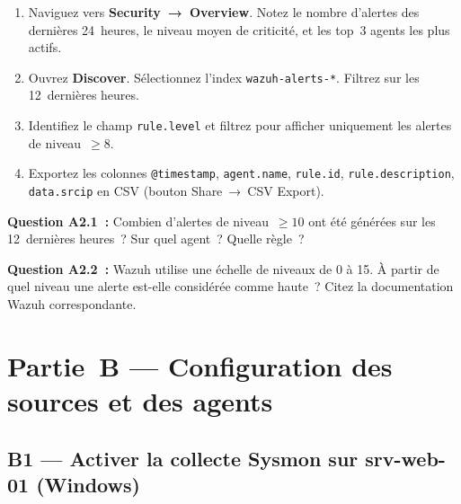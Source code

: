 \begin{enumerate}
  \item Naviguez vers \textbf{Security~→~Overview}.
        Notez le nombre d'alertes des dernières 24~heures, le niveau
        moyen de criticité, et les top~3 agents les plus actifs.
  \item Ouvrez \textbf{Discover}. Sélectionnez l'index
        \texttt{wazuh-alerts-*}. Filtrez sur les 12~dernières heures.
  \item Identifiez le champ \texttt{rule.level} et filtrez pour afficher
        uniquement les alertes de niveau~$\geq 8$.
  \item Exportez les colonnes \texttt{@timestamp},
        \texttt{agent.name}, \texttt{rule.id}, \texttt{rule.description},
        \texttt{data.srcip} en CSV (bouton Share~→~CSV Export).
\end{enumerate}

\begin{boxexo}
\textbf{Question A2.1~:} Combien d'alertes de niveau~$\geq 10$ ont été
générées sur les 12~dernières heures~? Sur quel agent~? Quelle règle~?

\medskip\textbf{Question A2.2~:} Wazuh utilise une échelle de niveaux
de 0 à 15. À partir de quel niveau une alerte est-elle considérée
comme haute~? Citez la documentation Wazuh correspondante.
\end{boxexo}


\section{Partie~B — Configuration des sources et des agents}
\label{lab1:partieB}

\subsection{B1 — Activer la collecte Sysmon sur srv-web-01 (Windows)}

